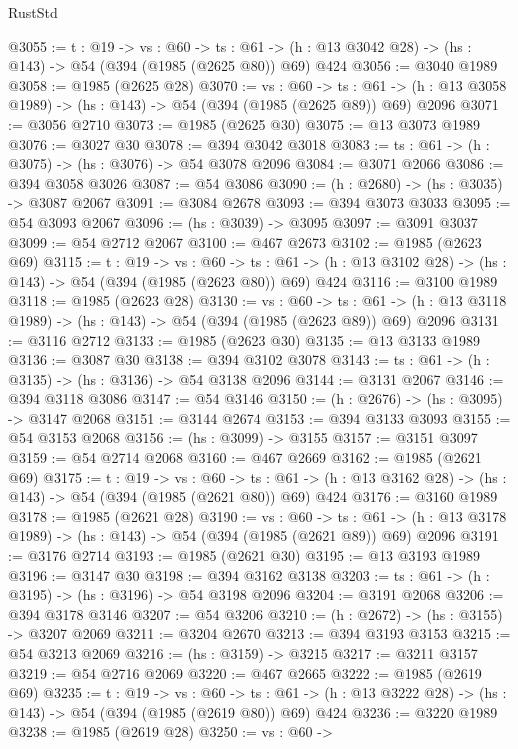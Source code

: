 \begin{lexlean}{RustStd}
\begin{coremodule}
{\begin{coremodule}
{{{{{{{{@3055 := {t : @19} ->
  {vs : @60} ->
  {ts : @61} -> (h : @13 @3042 @28) -> (hs : @143) -> @54 (@394 (@1985 (@2625 @80)) @69) @424
@3056 := @3040 @1989
@3058 := @1985 (@2625 @28)
@3070 := {vs : @60} ->
  {ts : @61} -> (h : @13 @3058 @1989) -> (hs : @143) -> @54 (@394 (@1985 (@2625 @89)) @69) @2096
@3071 := @3056 @2710
@3073 := @1985 (@2625 @30)
@3075 := @13 @3073 @1989
@3076 := @3027 @30
@3078 := @394 @3042 @3018
@3083 := {ts : @61} -> (h : @3075) -> (hs : @3076) -> @54 @3078 @2096
@3084 := @3071 @2066
@3086 := @394 @3058 @3026
@3087 := @54 @3086
@3090 := (h : @2680) -> (hs : @3035) -> @3087 @2067
@3091 := @3084 @2678
@3093 := @394 @3073 @3033
@3095 := @54 @3093 @2067
@3096 := (hs : @3039) -> @3095
@3097 := @3091 @3037
@3099 := @54 @2712 @2067
@3100 := @467 @2673
@3102 := @1985 (@2623 @69)
@3115 := {t : @19} ->
  {vs : @60} ->
  {ts : @61} -> (h : @13 @3102 @28) -> (hs : @143) -> @54 (@394 (@1985 (@2623 @80)) @69) @424
@3116 := @3100 @1989
@3118 := @1985 (@2623 @28)
@3130 := {vs : @60} ->
  {ts : @61} -> (h : @13 @3118 @1989) -> (hs : @143) -> @54 (@394 (@1985 (@2623 @89)) @69) @2096
@3131 := @3116 @2712
@3133 := @1985 (@2623 @30)
@3135 := @13 @3133 @1989
@3136 := @3087 @30
@3138 := @394 @3102 @3078
@3143 := {ts : @61} -> (h : @3135) -> (hs : @3136) -> @54 @3138 @2096
@3144 := @3131 @2067
@3146 := @394 @3118 @3086
@3147 := @54 @3146
@3150 := (h : @2676) -> (hs : @3095) -> @3147 @2068
@3151 := @3144 @2674
@3153 := @394 @3133 @3093
@3155 := @54 @3153 @2068
@3156 := (hs : @3099) -> @3155
@3157 := @3151 @3097
@3159 := @54 @2714 @2068
@3160 := @467 @2669
@3162 := @1985 (@2621 @69)
@3175 := {t : @19} ->
  {vs : @60} ->
  {ts : @61} -> (h : @13 @3162 @28) -> (hs : @143) -> @54 (@394 (@1985 (@2621 @80)) @69) @424
@3176 := @3160 @1989
@3178 := @1985 (@2621 @28)
@3190 := {vs : @60} ->
  {ts : @61} -> (h : @13 @3178 @1989) -> (hs : @143) -> @54 (@394 (@1985 (@2621 @89)) @69) @2096
@3191 := @3176 @2714
@3193 := @1985 (@2621 @30)
@3195 := @13 @3193 @1989
@3196 := @3147 @30
@3198 := @394 @3162 @3138
@3203 := {ts : @61} -> (h : @3195) -> (hs : @3196) -> @54 @3198 @2096
@3204 := @3191 @2068
@3206 := @394 @3178 @3146
@3207 := @54 @3206
@3210 := (h : @2672) -> (hs : @3155) -> @3207 @2069
@3211 := @3204 @2670
@3213 := @394 @3193 @3153
@3215 := @54 @3213 @2069
@3216 := (hs : @3159) -> @3215
@3217 := @3211 @3157
@3219 := @54 @2716 @2069
@3220 := @467 @2665
@3222 := @1985 (@2619 @69)
@3235 := {t : @19} ->
  {vs : @60} ->
  {ts : @61} -> (h : @13 @3222 @28) -> (hs : @143) -> @54 (@394 (@1985 (@2619 @80)) @69) @424
@3236 := @3220 @1989
@3238 := @1985 (@2619 @28)
@3250 := {vs : @60} ->
}}}}}}}}
\end{coremodule}}
\end{coremodule}
\end{lexlean}
